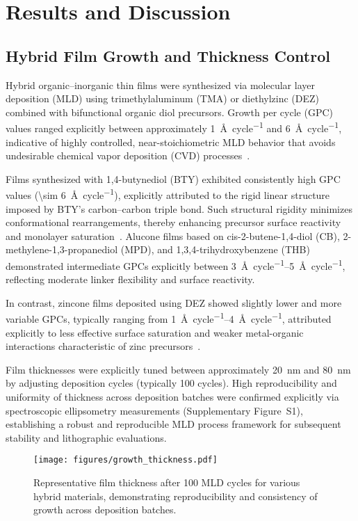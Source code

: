 \section{Results and Discussion}

\subsection{Hybrid Film Growth and Thickness Control}

Hybrid organic--inorganic thin films were synthesized via molecular layer deposition (MLD) using trimethylaluminum (TMA) or diethylzinc (DEZ) combined with bifunctional organic diol precursors. Growth per cycle (GPC) values ranged explicitly between approximately \SI{1}{\angstrom\per cycle} and \SI{6}{\angstrom\per cycle}, indicative of highly controlled, near-stoichiometric MLD behavior that avoids undesirable chemical vapor deposition (CVD) processes~\cite{REF}.

Films synthesized with 1,4-butynediol (BTY) exhibited consistently high GPC values (\SI{\sim 6}{\angstrom\per cycle}), explicitly attributed to the rigid linear structure imposed by BTY's carbon--carbon triple bond. Such structural rigidity minimizes conformational rearrangements, thereby enhancing precursor surface reactivity and monolayer saturation~\cite{REF}. Alucone films based on cis-2-butene-1,4-diol (CB), 2-methylene-1,3-propanediol (MPD), and 1,3,4-trihydroxybenzene (THB) demonstrated intermediate GPCs explicitly between \SIrange{3}{5}{\angstrom\per cycle}, reflecting moderate linker flexibility and surface reactivity.

In contrast, zincone films deposited using DEZ showed slightly lower and more variable GPCs, typically ranging from \SIrange{1}{4}{\angstrom\per cycle}, attributed explicitly to less effective surface saturation and weaker metal-organic interactions characteristic of zinc precursors~\cite{REF}.

Film thicknesses were explicitly tuned between approximately \SI{20}{\nano\meter} and \SI{80}{\nano\meter} by adjusting deposition cycles (typically 100 cycles). High reproducibility and uniformity of thickness across deposition batches were confirmed explicitly via spectroscopic ellipsometry measurements (Supplementary Figure~S1), establishing a robust and reproducible MLD process framework for subsequent stability and lithographic evaluations.


\begin{figure}[ht]
  \centering
  \texttt{[image: figures/growth\_thickness.pdf]}
  \caption{Representative film thickness after 100 MLD cycles for various hybrid materials, demonstrating reproducibility and consistency of growth across deposition batches.}
  \label{fig:growth_thickness}
\end{figure}



